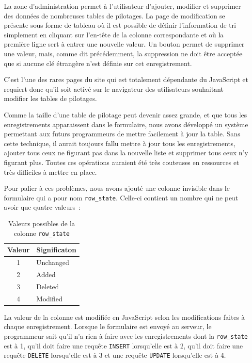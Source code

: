 \documentclass[letter, 11pt]{report}
\begin{document}
La zone d'administration permet à l'utilisateur d'ajouter, modifier et supprimer des données de nombreuses tables de pilotages. La page de modification se présente sous forme de tableau où il est possible de définir l'information de tri simplement en cliquant sur l'en-tête de la colonne correspondante et où la première ligne sert à entrer une nouvelle valeur. Un bouton permet de supprimer une valeur, mais, comme dit précédemment, la suppression ne doit être acceptée que si aucune clé étrangère n'est définie sur cet enregistrement.

C'est l'une des rares pages du site qui est totalement dépendante du JavaScript et requiert donc qu'il soit activé sur le navigateur des utilisateurs souhaitant modifier les tables de pilotages.

Comme la taille d'une table de pilotage peut devenir assez grande, et que tous les enregistrements apparaissent dans le formulaire, nous avons développé un système permettant aux futurs programmeurs de mettre facilement à jour la table. Sans cette technique, il aurait toujours fallu mettre à jour tous les enregistrements, ajouter tous ceux ne figurant pas dans la nouvelle liste et supprimer tous ceux n'y figurant plus. Toutes ces opérations auraient été très couteuses en ressources et très difficiles à mettre en place.

Pour palier à ces problèmes, nous avons ajouté une colonne invisible dans le formulaire qui a pour nom \texttt{row\_state}. Celle-ci contient un nombre qui ne peut avoir que quatre valeurs~:

\begin{table}[htbp]
	\caption{Valeurs possibles de la colonne \texttt{row\_state}}
	\begin{center}
		\begin{tabular}{|c|l|}
			\hline
			Valeur & Significaton \\
			\hline
			1      & Unchanged \\
			2      & Added \\
			3      & Deleted \\
			4      & Modified \\
			\hline
		\end{tabular}
	\end{center}
\end{table}

La valeur de la colonne est modifiée en JavaScript selon les modifications faites à chaque enregistrement. Lorsque le formulaire est envoyé au serveur, le programmeur sait qu'il n'a rien à faire avec les enregistrements dont la \texttt{row\_state} est à 1, qu'il doit faire une requête \texttt{INSERT} lorsqu'elle est à 2, qu'il doit faire une requête \texttt{DELETE} lorsqu'elle est à 3 et une requête \texttt{UPDATE} lorsqu'elle est à 4.
\end{document}
